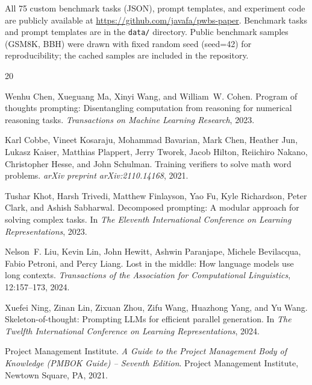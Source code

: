 \documentclass[11pt,a4paper]{article}
\begin{document}
All 75 custom benchmark tasks (JSON), prompt templates, and experiment code are publicly available at \url{https://github.com/javafa/pwbs-paper}. Benchmark tasks and prompt templates are in the \texttt{data/} directory. Public benchmark samples (GSM8K, BBH) were drawn with fixed random seed (seed=42) for reproducibility; the cached samples are included in the repository.


\begin{thebibliography}{20}

Wenhu Chen, Xueguang Ma, Xinyi Wang, and William~W. Cohen.
\newblock Program of thoughts prompting: Disentangling computation from reasoning for numerical reasoning tasks.
\newblock \emph{Transactions on Machine Learning Research}, 2023.

Karl Cobbe, Vineet Kosaraju, Mohammad Bavarian, Mark Chen, Heather Jun, Lukasz Kaiser, Matthias Plappert, Jerry Tworek, Jacob Hilton, Reiichiro Nakano, Christopher Hesse, and John Schulman.
\newblock Training verifiers to solve math word problems.
\newblock \emph{arXiv preprint arXiv:2110.14168}, 2021.

Tushar Khot, Harsh Trivedi, Matthew Finlayson, Yao Fu, Kyle Richardson, Peter Clark, and Ashish Sabharwal.
\newblock Decomposed prompting: A modular approach for solving complex tasks.
\newblock In \emph{The Eleventh International Conference on Learning Representations}, 2023.

Nelson~F. Liu, Kevin Lin, John Hewitt, Ashwin Paranjape, Michele Bevilacqua, Fabio Petroni, and Percy Liang.
\newblock Lost in the middle: How language models use long contexts.
\newblock \emph{Transactions of the Association for Computational Linguistics}, 12:157--173, 2024.

Xuefei Ning, Zinan Lin, Zixuan Zhou, Zifu Wang, Huazhong Yang, and Yu Wang.
\newblock Skeleton-of-thought: Prompting {LLMs} for efficient parallel generation.
\newblock In \emph{The Twelfth International Conference on Learning Representations}, 2024.

{Project Management Institute}.
\newblock \emph{A Guide to the Project Management Body of Knowledge ({PMBOK} Guide) -- Seventh Edition}.
\newblock Project Management Institute, Newtown Square, PA, 2021.


\end{thebibliography}
\end{document}
